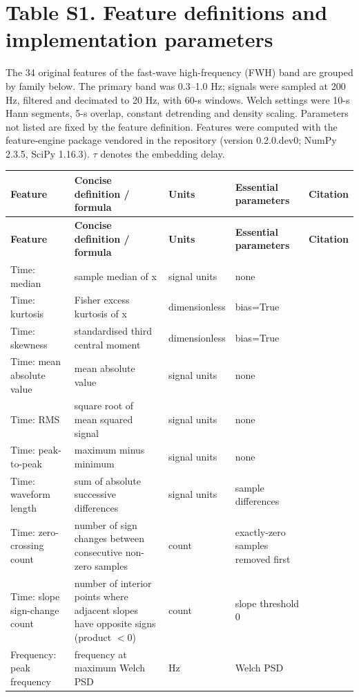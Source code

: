 \documentclass[10pt]{article}
\begin{document}
\section*{Table S1. Feature definitions and implementation parameters}\label{tab:s1_features}
The 34 original features of the fast-wave high-frequency (FWH) band are grouped by family below. The primary band was 0.3--1.0 Hz; signals were sampled at 200 Hz, filtered and decimated to 20 Hz, with 60-s windows. Welch settings were 10-s Hann segments, 5-s overlap, constant detrending and density scaling. Parameters not listed are fixed by the feature definition. Features were computed with the feature-engine package vendored in the repository (version 0.2.0.dev0; NumPy 2.3.5, SciPy 1.16.3). $\tau$ denotes the embedding delay.
\begin{longtable}{p{3.4cm}p{6.2cm}p{2.0cm}p{4.7cm}p{3.2cm}}
\toprule
\textbf{Feature} & \textbf{Concise definition / formula} & \textbf{Units} & \textbf{Essential parameters} & \textbf{Citation} \\
\midrule
\endfirsthead
\toprule
\textbf{Feature} & \textbf{Concise definition / formula} & \textbf{Units} & \textbf{Essential parameters} & \textbf{Citation} \\
\midrule
\endhead
Time: median & sample median of x & signal units & none &  \\
Time: kurtosis & Fisher excess kurtosis of x & dimensionless & bias=True &  \\
Time: skewness & standardised third central moment & dimensionless & bias=True &  \\
Time: mean absolute value & mean absolute value & signal units & none &  \\
Time: RMS & square root of mean squared signal & signal units & none & \citep{Hudgins1993NewStrategy} \\
Time: peak-to-peak & maximum minus minimum & signal units & none &  \\
Time: waveform length & sum of absolute successive differences & signal units & sample differences & \citep{Hudgins1993NewStrategy} \\
Time: zero-crossing count & number of sign changes between consecutive non-zero samples & count & exactly-zero samples removed first &  \\
Time: slope sign-change count & number of interior points where adjacent slopes have opposite signs (product $<0$) & count & slope threshold 0 &  \\
Frequency: peak frequency & frequency at maximum Welch PSD & Hz & Welch PSD & \citep{Welch1967PSD} \\

\end{longtable}
\end{document}
